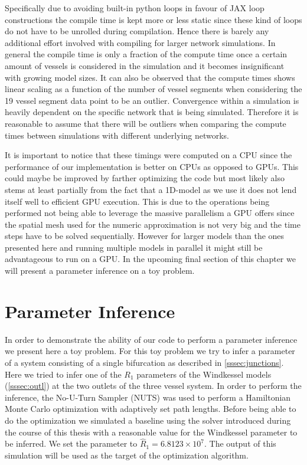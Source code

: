 \documentclass[a4paper, oneside]{discothesis}
\begin{document}
Specifically due to avoiding built-in python loops in favour of JAX loop constructions the compile time is kept more or less static since these kind of loops do not have to be unrolled during compilation.
Hence there is barely any additional effort involved with compiling for larger network simulations.
In general the compile time is only a fraction of the compute time once a certain amount of vessels is considered in the simulation and it becomes insignificant with growing model sizes.
It can also be observed that the compute times shows linear scaling as a function of the number of vessel segments when considering the 19 vessel segment data point to be an outlier.
Convergence within a simulation is heavily dependent on the specific network that is being simulated.
Therefore it is reasonable to assume that there will be outliers when comparing the compute times between simulations with different underlying networks.

It is important to notice that these timings were computed on a CPU since the performance of our implementation is better on CPUs as opposed to GPUs.
This could maybe be improved by farther optimizing the code but most likely also stems at least partially from the fact that a 1D-model as we use it does not lend itself well to efficient GPU execution.
This is due to the operations being performed not being able to leverage the massive parallelism a GPU offers since the spatial mesh used for the numeric approximation is not very big and the time steps have to be solved sequentially.
However for larger models than the ones presented here and running multiple models in parallel it might still be advantageous to run on a GPU.
In the upcoming final section of this chapter we will present a parameter inference on a toy problem.


\section{Parameter Inference} \label{sec:pi}
In order to demonstrate the ability of our code to perform a parameter inference we present here a toy problem.
For this toy problem we try to infer a parameter of a system consisting of a single bifurcation as described in \autoref{sssec:junctions}.
Here we tried to infer one of the $R_1$ parameters of the Windkessel models (\autoref{sssec:outl}) at the two outlets of the three vessel system.
In order to perform the inference, the No-U-Turn Sampler (NUTS) \cite{hoffman2014no} was used to perform a Hamiltonian Monte Carlo \cite{duane1987hybrid} optimization with adaptively set path lengths.
Before being able to do the optimization we simulated a baseline using the solver introduced during the course of this thesis with a reasonable value for the Windkessel parameter to be inferred.
We set the parameter to $\hat{R}_1=6.8123 \times 10^7$.
The output of this simulation will be used as the target of the optimization algorithm.
 
\end{document}
